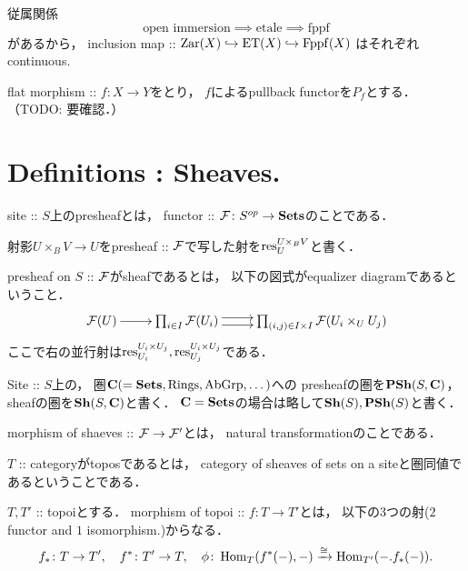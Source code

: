 \documentclass[a4paper]{jsarticle}
\begin{document}
\begin{Example}
    従属関係
    \[ \text{open immersion} \implies \text{etale} \implies \text{fppf} \]
    があるから，
    inclusion map :: $\mathrm{Zar}(X) \hookrightarrow \mathrm{ET}(X) \hookrightarrow \mathrm{Fppf}(X)$
    はそれぞれcontinuous.
\end{Example}

\begin{Example}
    flat morphism :: $f \colon X \to Y$をとり，
    $f$によるpullback functorを$P_{f}$とする．
    （TODO: 要確認．）
\end{Example}

\section{Definitions : Sheaves.}
\begin{Def}
    \begin{myenum}{\roman*}
    \item
    site :: $S$上のpresheafとは，
    functor :: $\mathcal{F} \colon S^{op} \to \mathbf{Sets}$のことである．

    \item
    射影$U \times_B V \to U$をpresheaf :: $\mathcal{F}$で写した射を$\operatorname{res}_{U}^{U \times_B V}$と書く．

    \item
    presheaf on $S$ :: $\mathcal{F}$がsheafであるとは，
    以下の図式がequalizer diagramであるということ．
    \[\xymatrix{
        \shF(U) \ar[r]& \prod_{i \in I} \shF(U_i)
            \ar@<1mm>[r]\ar@<-1mm>[r]& \prod_{(i,j) \in I \times I} \shF(U_i \times_U U_j)
    }\]
    ここで右の並行射は$\operatorname{res}_{U_i}^{U_i \times U_j}, \operatorname{res}_{U_j}^{U_i \times U_j}$である．

    \item
    Site :: $S$上の，
    圏$\mathbf{C}(=\mathbf{Sets}, \mathrm{Rings}, \mathrm{AbGrp}, \dots)$への
    presheafの圏を$\mathbf{PSh}(S, \mathbf{C})$，sheafの圏を$\mathbf{Sh}(S, \mathbf{C})$と書く．
    $\mathbf{C}=\mathbf{Sets}$の場合は略して$\mathbf{Sh}(S), \mathbf{PSh}(S)$と書く．

    \item
    morphism of shaeves :: $\mathcal{F} \to \mathcal{F}'$とは，
    natural transformationのことである．

    \item
    $T$ :: categoryがtoposであるとは，
    category of sheaves of sets on a siteと圏同値であるということである．

    \item
    $T, T'$ :: topoiとする．
    morphism of topoi :: $f \colon T \to T'$とは，
    以下の$3$つの射($2$ functor and $1$ isomorphism.)からなる．
    \[
        f_* \colon T \to T', \quad f^* \colon T' \to T,
        \quad \phi \colon \operatorname{Hom}_{T}(f^*(-), -) \xrightarrow{\cong} \operatorname{Hom}_{T'}(-. f_*(-)).
    \]
\end{myenum}
\end{Def}
\end{document}
